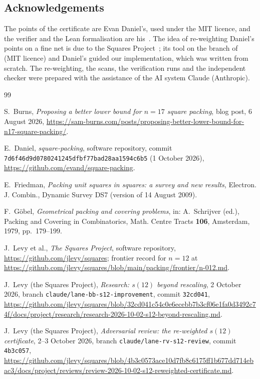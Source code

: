 \documentclass[11pt]{amsart}
\theoremstyle{definition}
\theoremstyle{remark}
\begin{document}
\subsection*{Acknowledgements}
The points of the certificate are Evan Daniel's, used under the MIT licence, and the verifier and the Lean formalisation are his~\cite{Dan26}. The idea of re-weighting Daniel's points on a fine net is due to the Squares Project~\cite{Lev26b}; its tool  on the branch of~\cite{Lev26b} (MIT licence) and Daniel's  guided our implementation, which was written from scratch. The re-weighting, the scans, the verification runs and the independent checker were prepared with the assistance of the AI system Claude (Anthropic).

\begin{thebibliography}{99}

S.~Burns, \emph{Proposing a better lower bound for $n=17$ square packing}, blog post, 6 August 2026, \url{https://sam-burns.com/posts/proposing-better-lower-bound-for-n17-square-packing/}.

E.~Daniel, \emph{square-packing}, software repository, commit \texttt{7d6f46d9d0780241245dfbf77bad28aa1594c6b5} (1 October 2026), \url{https://github.com/evand/square-packing}.

E.~Friedman, \emph{Packing unit squares in squares: a survey and new results}, Electron. J. Combin., Dynamic Survey DS7 (version of 14 August 2009).

F.~G\"obel, \emph{Geometrical packing and covering problems}, in: A.~Schrijver (ed.), Packing and Covering in Combinatorics, Math. Centre Tracts \textbf{106}, Amsterdam, 1979, pp.~179--199.

J.~Levy et al., \emph{The Squares Project}, software repository, \url{https://github.com/jlevy/squares}; frontier record for $n=12$ at \url{https://github.com/jlevy/squares/blob/main/packing/frontier/n-012.md}.

J.~Levy (the Squares Project), \emph{Research: $s(12)$ beyond rescaling}, 2 October 2026, branch \texttt{claude/lane-bb-s12-improvement}, commit \texttt{32cd041}, \url{https://github.com/jlevy/squares/blob/32cd041c54c0e6ecebb7b3cf06e1fa0d3492c74f/docs/project/research/research-2026-10-02-s12-beyond-rescaling.md}.

J.~Levy (the Squares Project), \emph{Adversarial review: the re-weighted $s(12)$ certificate}, 2--3 October 2026, branch \texttt{claude/lane-rv-s12-review}, commit \texttt{4b3c057}, \url{https://github.com/jlevy/squares/blob/4b3c0573ace10d7fb8c6175ff1b677dd714ebac3/docs/project/reviews/review-2026-10-02-s12-reweighted-certificate.md}.


\end{thebibliography}
\end{document}
